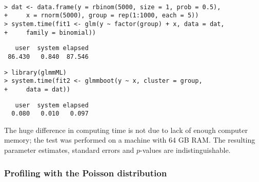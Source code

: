 \documentclass[a4paper,11pt]{article}
\begin{document}
\begin{verbatim}

> dat <- data.frame(y = rbinom(5000, size = 1, prob = 0.5), 
+     x = rnorm(5000), group = rep(1:1000, each = 5))
> system.time(fit1 <- glm(y ~ factor(group) + x, data = dat, 
+     family = binomial))
\end{verbatim}
\begin{verbatim}
   user  system elapsed 
 86.430   0.840  87.546
\end{verbatim} 
\begin{verbatim}
> library(glmmML)
> system.time(fit2 <- glmmboot(y ~ x, cluster = group, 
+     data = dat))
\end{verbatim}
\begin{verbatim}
   user  system elapsed 
  0.080   0.010   0.097 
\end{verbatim}
The huge difference in computing time is not due to lack of enough computer
memory; the test was performed on a machine with 64 GB RAM. The resulting
parameter estimates, standard errors and $p$-values are indistinguishable.

\subsubsection{Profiling with the Poisson distribution}
\end{document}
